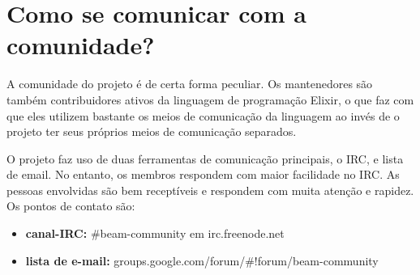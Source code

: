 \section{Como se comunicar com a comunidade?}
\label{cap:como-se-comunicar}

 A comunidade do projeto é de certa forma peculiar. Os mantenedores são também
 contribuidores ativos da linguagem de programação Elixir, o que faz com que
 eles utilizem bastante os meios de comunicação da linguagem ao invés de o projeto
 ter seus próprios meios de comunicação separados.

 O projeto faz uso de duas ferramentas de comunicação principais, o IRC,
 e lista de email. No entanto, os membros respondem com maior facilidade no
 IRC. As pessoas envolvidas são bem receptíveis e respondem com muita atenção
 e rapidez. Os pontos de contato são:

 \begin{itemize}
   \item \textbf{canal-IRC:}  \#beam-community em irc.freenode.net
   \item \textbf{lista de e-mail:} groups.google.com/forum/\#!forum/beam-community
 \end{itemize}

